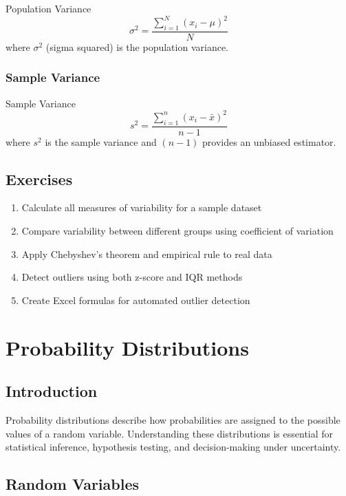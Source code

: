 \documentclass[12pt,a4paper]{book}
\begin{document}
\begin{definition}{Population Variance}
\[
\sigma^2 = \frac{\sum_{i=1}^{N} (x_i - \mu)^2}{N}
\]
where $\sigma^2$ (sigma squared) is the population variance.
\end{definition}

\subsection{Sample Variance}

\begin{definition}{Sample Variance}
\[
s^2 = \frac{\sum_{i=1}^{n} (x_i - \bar{x})^2}{n-1}
\]
where $s^2$ is the sample variance and $(n-1)$ provides an unbiased estimator.
\end{definition}

\section{Exercises}

\begin{enumerate}
    \item Calculate all measures of variability for a sample dataset
    \item Compare variability between different groups using coefficient of variation
    \item Apply Chebyshev's theorem and empirical rule to real data
    \item Detect outliers using both z-score and IQR methods
    \item Create Excel formulas for automated outlier detection
\end{enumerate}

\chapter{Probability Distributions}

\section{Introduction}

Probability distributions describe how probabilities are assigned to the possible values of a random variable. Understanding these distributions is essential for statistical inference, hypothesis testing, and decision-making under uncertainty.

\section{Random Variables}
\end{document}
